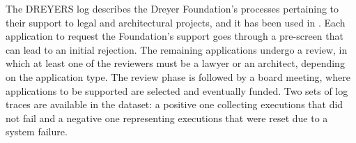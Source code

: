 The DREYERS log describes the Dreyer Foundation’s processes pertaining to their support to legal and architectural projects, and it has been used in \cite{DBLP:conf/ssci/DeboisS15,DBLP:conf/bpm/SlaatsDB21}. Each application to request the Foundation's support goes through a pre-screen that can lead to an initial rejection. The remaining applications undergo a review, in which at least one of the reviewers must be a lawyer or an architect, depending on the application type. The review phase is followed by a board meeting, where applications to be supported are selected and eventually funded.
Two sets of log traces are available in the dataset: a positive one collecting executions that did not fail and a negative one representing executions that were reset due to a system failure. %

